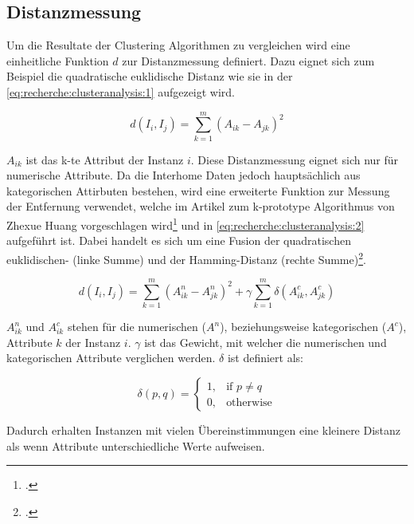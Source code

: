 \subsection{Distanzmessung}
\label{sec:konzept:anwendungderalgorithmen:distanzmessung}
Um die Resultate der Clustering Algorithmen zu vergleichen wird eine einheitliche Funktion $d$ zur Distanzmessung definiert.
Dazu eignet sich zum Beispiel die quadratische euklidische Distanz wie sie in der \cref{eq:recherche:clusteranalysis:1} aufgezeigt wird.

\begin{equation} \label{eq:recherche:clusteranalysis:1}
d(I_i, I_j) = \sum_{k=1}^{m} (A_{ik} - A_{jk})^2
\end{equation}

$A_{ik}$ ist das k-te Attribut der Instanz $i$. 
Diese Distanzmessung eignet sich nur für numerische Attribute.
Da die Interhome Daten jedoch hauptsächlich aus kategorischen Attirbuten bestehen, wird  eine erweiterte Funktion zur Messung der Entfernung verwendet, welche im Artikel zum k-prototype Algorithmus von Zhexue Huang vorgeschlagen wird\footcite{clustering_numeric_and_categorical_values} und in \cref{eq:recherche:clusteranalysis:2} aufgeführt ist.
Dabei handelt es sich um eine Fusion der quadratischen euklidischen- (linke Summe) und der Hamming-Distanz (rechte Summe)\footcite{data_mining_concepts_and_techniques}.

\begin{equation} \label{eq:recherche:clusteranalysis:2}
d(I_i, I_j) = \sum_{k=1}^{m} (A^n_{ik} - A^n_{jk})^2 + \gamma \sum_{k=1}^{m} \delta(A^c_{ik}, A^c_{jk})
\end{equation}

$A^n_{ik}$ und $A^c_{ik}$ stehen für die numerischen ($A^n$), beziehungsweise kategorischen ($A^c$), Attribute $k$ der Instanz $i$. 
$\gamma$ ist das Gewicht, mit welcher die numerischen und kategorischen Attribute verglichen werden.
$\delta$ ist definiert als:

\begin{equation} \label{eq:recherche:clusteranalysis:3}
\delta(p,q)= 
\begin{cases}
1,				& \text{if } p \neq q\\
0,              & \text{otherwise}
\end{cases}
\end{equation}

Dadurch erhalten Instanzen mit vielen Übereinstimmungen eine kleinere Distanz als wenn Attribute unterschiedliche Werte aufweisen.

